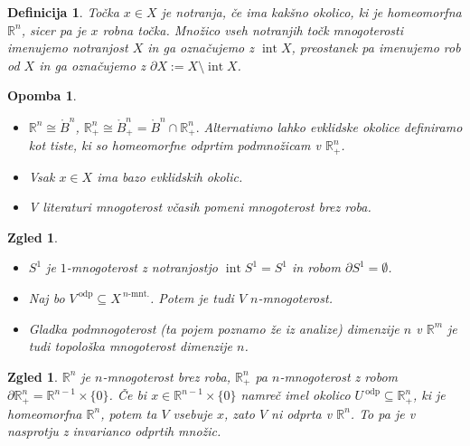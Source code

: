 \documentclass[10pt, a4paper]{article}
\newtheorem{defi}[izr]{Definicija}
\newenvironment{noticeB}{%
  \tcolorbox[%
  notitle,
  empty,
  enhanced,  %
  breakable,
  coltext=black,
  colback=white, 
  fontupper=\rmfamily,
  noparskip,
  sharp corners,
  boxrule=-1pt,  %
  frame hidden,
  left=7pt,  %
  right=7pt,
  top=5pt,
  bottom=5pt,
  before skip=2.5ex plus 2pt,
  after skip=2.5ex plus 2pt,
  borderline west = {1.5pt}{-0.1pt}{blue!30!black}, %
  overlay unbroken and last={%
    \draw[color=black, line width=1.25pt]
    ($(frame.south west)+(1.pt, -0.1pt)$) -- ++(2em, 0);
  }
  ]}
{\endtcolorbox}
\newenvironment{definicija}{\begin{noticeB}\begin{defi}}{%
\end{defi}\end{noticeB}}
\newtheorem*{opomba}{Opomba}
\newtheorem{zgled}[izr]{Zgled}
\newcommand{\R}{\mathbb {R}}
\DeclareMathOperator{\intem}{int}
\begin{document}
\begin{definicija}
  Točka $x \in X$ je notranja, če ima kakšno okolico, ki je homeomorfna $\R^n$,
  sicer pa je $x$ robna točka. Množico vseh notranjih točk mnogoterosti 
  imenujemo notranjost $X$ in ga označujemo z $\intem X$, preostanek pa imenujemo rob od $X$
  in ga označujemo z $\partial X := X \setminus \intem X$. 
\end{definicija}

\begin{opomba}
  \begin{itemize}
    \item $\R^n \cong \mathring{B}^n$, $\R^n_+ \cong \mathring{B}^n_+ = \mathring{B}^n \cap \R^n _+.$
    Alternativno lahko evklidske okolice definiramo kot tiste, ki so homeomorfne odprtim podmnožicam v $\R^n_+$.
    \item Vsak $x \in X$ ima bazo evklidskih okolic.
    \item V literaturi mnogoterost včasih pomeni mnogoterost brez roba.
  \end{itemize}
\end{opomba}

\begin{zgled}
  \begin{itemize}
    \item $S^1$ je $1$-mnogoterost z notranjostjo $\intem S^1 = S^1$ in robom $\partial S^1 = \emptyset$.
    \item Naj bo $V^{\ \text{odp}} \subseteq X^{\ \text{$n$-mnt.}}$. Potem je tudi $V$ $n$-mnogoterost.
    \item Gladka podmnogoterost (ta pojem poznamo že iz analize) dimenzije $n$ v $\R^m$ je tudi topološka 
    mnogoterost dimenzije $n$.
  \end{itemize}
\end{zgled}

\begin{zgled}
$\R^n$ je $n$-mnogoterost brez roba, $\R^n_+$ pa $n$-mnogoterost z robom $\partial \R^n_+ = \R^{n - 1} \times \{0\}$.
    Če bi $x \in \R^{n - 1} \times \{0\}$ namreč imel okolico $U^{\ \text{odp}}\subseteq \R^n_+$, ki je homeomorfna $\R^n$,
    potem ta $V$ vsebuje $x$, zato $V$ ni odprta v $\R^n$. To pa je v nasprotju z invarianco odprtih množic.  
\end{zgled}
  
\end{document}
